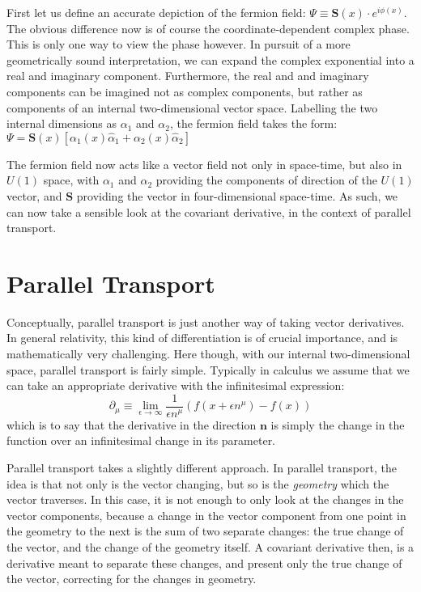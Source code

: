 \documentclass{article}
\begin{document}
        First let us define an accurate depiction of the fermion field:
        $\Psi \equiv \mathbf{S}(x) \cdot e^{i \phi(x)}$. 
        The obvious difference now is of course the coordinate-dependent complex phase. This is only one way to view the phase however. In pursuit of a more geometrically sound interpretation, we can expand the complex exponential into a real and imaginary component. Furthermore, the real and and imaginary components can be imagined not as complex components, but rather as components of an internal two-dimensional vector space. Labelling the two internal dimensions as $\alpha_1$ and $\alpha_2$, the fermion field takes the form:
        $\Psi =  \mathbf{S}(x) \left[ \alpha_1(x) \hat\alpha_1 + \alpha_2(x) \hat\alpha_2 \right]$ 

        The fermion field now acts like a vector field not only in space-time, but also in $U(1)$ space, with $\alpha_1$ and $\alpha_2$ providing the components of direction of the $U(1)$ vector, and $\mathbf{S}$ providing the vector in four-dimensional space-time. As such, we can now take a sensible look at the covariant derivative, in the context of parallel transport.


\section{Parallel Transport}
        Conceptually, parallel transport is just another way of taking vector derivatives. In general relativity, this kind of differentiation is of crucial importance, and is mathematically very challenging. Here though, with our internal two-dimensional space, parallel transport is fairly simple. Typically in calculus we assume that we can take an appropriate derivative with the infinitesimal expression:
        $$ \partial_\mu \equiv \lim_{\epsilon\to\infty} \frac{1}{\epsilon n^\mu} (f(x + \epsilon n^\mu) - f(x)) $$
        which is to say that the derivative in the direction $\mathbf{n}$ is simply the change in the function over an infinitesimal change in its parameter.
        
        Parallel transport takes a slightly different approach. In parallel transport, the idea is that not only is the vector changing, but so is the \textit{geometry} which the vector traverses. In this case, it is not enough to only look at the changes in the vector components, because a change in the vector component from one point in the geometry to the next is the sum of two separate changes: the true change of the vector, and the change of the geometry itself. A covariant derivative then, is a derivative meant to separate these changes, and present only the true change of the vector, correcting for the changes in geometry. 
\end{document}
